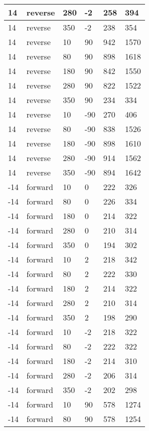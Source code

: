 \begin{longtable}{|l|l|l|l|l|l|}
			\hline
			14 & reverse & 280 & -2 & 258 & 394 \\
			\hline
			14 & reverse & 350 & -2 & 238 & 354 \\
			\hline
			14 & reverse & 10 & 90 & 942 & 1570 \\
			\hline
			14 & reverse & 80 & 90 & 898 & 1618 \\
			\hline
			14 & reverse & 180 & 90 & 842 & 1550 \\
			\hline
			14 & reverse & 280 & 90 & 822 & 1522 \\
			\hline
			14 & reverse & 350 & 90 & 234 & 334 \\
			\hline
			14 & reverse & 10 & -90 & 270 & 406 \\
			\hline
			14 & reverse & 80 & -90 & 838 & 1526 \\
			\hline
			14 & reverse & 180 & -90 & 898 & 1610 \\
			\hline
			14 & reverse & 280 & -90 & 914 & 1562 \\
			\hline
			14 & reverse & 350 & -90 & 894 & 1642 \\
			\hline
			-14 & forward & 10 & 0 & 222 & 326 \\
			\hline
			-14 & forward & 80 & 0 & 226 & 334 \\
			\hline
			-14 & forward & 180 & 0 & 214 & 322 \\
			\hline
			-14 & forward & 280 & 0 & 210 & 314 \\
			\hline
			-14 & forward & 350 & 0 & 194 & 302 \\
			\hline
			-14 & forward & 10 & 2 & 218 & 342 \\
			\hline
			-14 & forward & 80 & 2 & 222 & 330 \\
			\hline
			-14 & forward & 180 & 2 & 214 & 322 \\
			\hline
			-14 & forward & 280 & 2 & 210 & 314 \\
			\hline
			-14 & forward & 350 & 2 & 198 & 290 \\
			\hline
			-14 & forward & 10 & -2 & 218 & 322 \\
			\hline
			-14 & forward & 80 & -2 & 222 & 322 \\
			\hline
			-14 & forward & 180 & -2 & 214 & 310 \\
			\hline
			-14 & forward & 280 & -2 & 206 & 314 \\
			\hline
			-14 & forward & 350 & -2 & 202 & 298 \\
			\hline
			-14 & forward & 10 & 90 & 578 & 1274 \\
			\hline
			-14 & forward & 80 & 90 & 578 & 1254 \\

\end{longtable}
